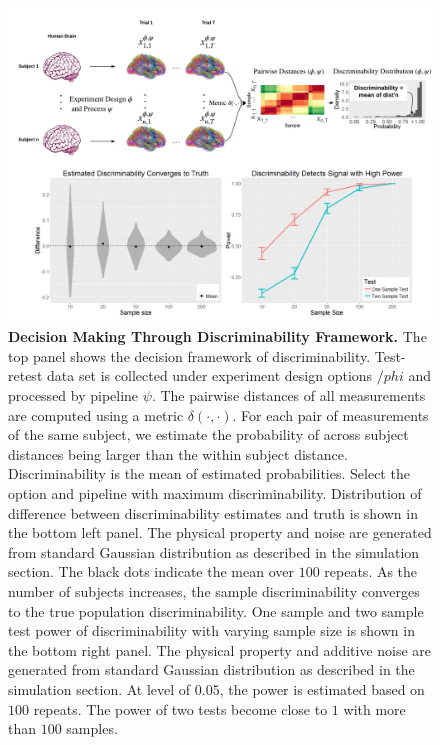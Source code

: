 \documentclass{article}
\begin{document}
\begin{figure}[H]
	\includegraphics[width=\linewidth]{../Figs/flow_simu.png}
	\caption{{\bf Decision Making Through Discriminability Framework.} The top panel shows the decision framework of discriminability. Test-retest data set is collected under experiment design options $/phi$ and processed by pipeline $\psi$. The pairwise distances of all measurements are computed using a metric $\delta(\cdot,\cdot)$. For each pair of measurements of the same subject, we estimate the probability of across subject distances being larger than the within subject distance. Discriminability is the mean of estimated probabilities. Select the option and pipeline with maximum discriminability. 
	 Distribution of difference between discriminability estimates and truth is shown in the bottom left panel. The physical property and noise are generated from standard Gaussian distribution as described in the simulation section. The black dots indicate the mean over $100$ repeats. As the number of subjects increases, the sample discriminability converges to the true population discriminability.
	 One sample and two sample test power of discriminability with varying sample size is shown in the bottom right panel. The physical property and additive noise are generated from standard Gaussian distribution as described in the simulation section. At level of $0.05$, the power is estimated based on $100$ repeats. The power of two tests become close to $1$ with more than $100$ samples.}
	\label{fig:fc}
\end{figure}
\end{document}
